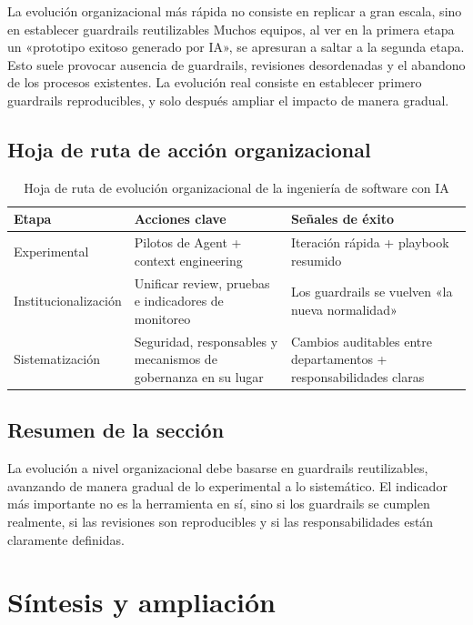 \documentclass[a4paper]{article}
\begin{document}
\begin{importantbox}{La evolución organizacional más rápida no consiste en replicar a gran escala, sino en establecer guardrails reutilizables}
Muchos equipos, al ver en la primera etapa un «prototipo exitoso generado por IA», se apresuran a saltar a la segunda etapa. Esto suele provocar ausencia de guardrails, revisiones desordenadas y el abandono de los procesos existentes. La evolución real consiste en establecer primero guardrails reproducibles, y solo después ampliar el impacto de manera gradual.
\end{importantbox}

\subsection{Hoja de ruta de acción organizacional}

\begin{table}[H]
\centering
\begin{tabular}{p{} p{} p{}}
\toprule
Etapa & Acciones clave & Señales de éxito \\
\midrule
Experimental & Pilotos de Agent + context engineering & Iteración rápida + playbook resumido \\
Institucionalización & Unificar review, pruebas e indicadores de monitoreo & Los guardrails se vuelven «la nueva normalidad» \\
Sistematización & Seguridad, responsables y mecanismos de gobernanza en su lugar & Cambios auditables entre departamentos + responsabilidades claras \\
\bottomrule
\end{tabular}
\caption{Hoja de ruta de evolución organizacional de la ingeniería de software con IA}
\end{table}

\subsection{Resumen de la sección}

La evolución a nivel organizacional debe basarse en guardrails reutilizables, avanzando de manera gradual de lo experimental a lo sistemático. El indicador más importante no es la herramienta en sí, sino si los guardrails se cumplen realmente, si las revisiones son reproducibles y si las responsabilidades están claramente definidas.
\section{Síntesis y ampliación}
\end{document}
